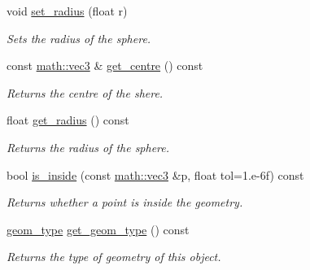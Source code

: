 \begin{DoxyCompactItemize}
\mbox{\label{classphysim_1_1geom_1_1sphere_a1ca106e9b949a76660e0c1dad7f1147b}} 
void \hyperlink{classphysim_1_1geom_1_1sphere_a1ca106e9b949a76660e0c1dad7f1147b}{set\+\_\+radius} (float r)
\begin{DoxyCompactList}\small\item\em Sets the radius of the sphere. \end{DoxyCompactList}\item 
\mbox{\label{classphysim_1_1geom_1_1sphere_a575a0c13d6a2e3520ccd96ece1e8b480}} 
const \hyperlink{structphysim_1_1math_1_1vec3}{math\+::vec3} \& \hyperlink{classphysim_1_1geom_1_1sphere_a575a0c13d6a2e3520ccd96ece1e8b480}{get\+\_\+centre} () const
\begin{DoxyCompactList}\small\item\em Returns the centre of the shere. \end{DoxyCompactList}\item 
\mbox{\label{classphysim_1_1geom_1_1sphere_a735dc0ef421d23ebbb467bbd8403ea51}} 
float \hyperlink{classphysim_1_1geom_1_1sphere_a735dc0ef421d23ebbb467bbd8403ea51}{get\+\_\+radius} () const
\begin{DoxyCompactList}\small\item\em Returns the radius of the sphere. \end{DoxyCompactList}\item 
bool \hyperlink{classphysim_1_1geom_1_1sphere_a418c319892851c7a29e1a37e07a6811e}{is\+\_\+inside} (const \hyperlink{structphysim_1_1math_1_1vec3}{math\+::vec3} \&p, float tol=1.e-\/6f) const
\begin{DoxyCompactList}\small\item\em Returns whether a point is inside the geometry. \end{DoxyCompactList}\item 
\mbox{\label{classphysim_1_1geom_1_1sphere_aae557a2702e79f02bbb43880203962cc}} 
\hyperlink{namespacephysim_1_1geom_a473d69ab4667a730784b37b67fa4b658}{geom\+\_\+type} \hyperlink{classphysim_1_1geom_1_1sphere_aae557a2702e79f02bbb43880203962cc}{get\+\_\+geom\+\_\+type} () const
\begin{DoxyCompactList}\small\item\em Returns the type of geometry of this object. \end{DoxyCompactList}\item 

\end{DoxyCompactItemize}
